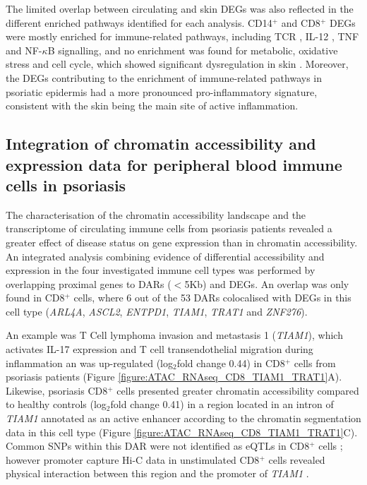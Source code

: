 The limited overlap between circulating and skin DEGs was also reflected in the different enriched pathways identified for each analysis. CD14$^+$ and CD8$^+$ DEGs were mostly enriched for immune-related pathways, including TCR , IL-12 , TNF and NF-$\kappa$B signalling, and no enrichment was found for metabolic, oxidative stress and cell cycle, which showed significant dysregulation in skin . %
Moreover, the DEGs contributing to the enrichment of immune-related pathways in psoriatic epidermis had a more pronounced pro-inflammatory signature, consistent with the skin being the main site of active inflammation.


\subsection{Integration of chromatin accessibility and expression data for peripheral blood immune cells in psoriasis}
The characterisation of the chromatin accessibility landscape and the transcriptome of circulating immune cells from psoriasis patients revealed a greater effect of disease status on gene expression than in chromatin accessibility. An integrated analysis combining evidence of differential accessibility and expression in the four investigated immune cell types was performed by overlapping proximal genes to DARs ($<$5Kb) and DEGs. An overlap was only found in CD8$^+$ cells, where 6 out of the 53 DARs colocalised with DEGs in this cell type (\textit{ARL4A}, \textit{ASCL2}, \textit{ENTPD1}, \textit{TIAM1}, \textit{TRAT1} and \textit{ZNF276}).

An example was T Cell lymphoma invasion and metastasis 1 (\textit{TIAM1}), which activates IL-17 expression and T cell transendothelial migration during inflammation \parencite{Kurdi2016, Gerard2009} an was up-regulated (log$_2$fold change 0.44) in CD8$^+$ cells from psoriasis patients (Figure \ref{figure:ATAC_RNAseq_CD8_TIAM1_TRAT1}A). Likewise, psoriasis CD8$^+$ cells presented greater chromatin accessibility compared to healthy controls (log$_2$fold change 0.41) in a region located in an intron of \textit{TIAM1} annotated as an active enhancer according to the chromatin segmentation data in this cell type (Figure \ref{figure:ATAC_RNAseq_CD8_TIAM1_TRAT1}C). Common SNPs within this DAR were not identified as eQTLs in CD8$^+$ cells \parencite{Kasela2017}; however promoter capture Hi-C data in unstimulated CD8$^+$ cells revealed physical interaction between this region and the promoter of \textit{TIAM1} \parencite{Javierre2016}. 

